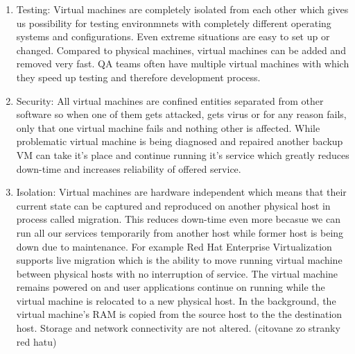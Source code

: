 \begin{enumerate}
\begin{enumerate}
\item Testing: Virtual machines are completely isolated from each other which gives us possibility for testing environmnets with completely different operating systems and configurations. Even extreme situations are easy to set up or changed. Compared to physical machines, virtual machines can be added and removed very fast. QA teams often have multiple virtual machines with which they speed up testing and therefore development process.
\item Security: All virtual machines are confined entities separated from other software so when one of them gets attacked, gets virus or for any reason fails, only that one virtual machine fails and nothing other is affected. While problematic virtual machine is being diagnosed and repaired another backup VM can take it's place and continue running it's service which greatly reduces down-time and increases reliability of offered service.
\item Isolation: Virtual machines are hardware independent which means that their current state can be captured and reproduced on another physical host in process called migration. This reduces down-time even more becasue we can run all our services temporarily from another host while former host is being down due to maintenance. For example Red Hat Enterprise Virtualization supports live migration which is the ability to move running virtual machine between physical hosts with no interruption of service. The virtual machine remains powered on and user applications continue on running while the virtual machine is relocated to a new physical host. In the background, the virtual machine's RAM is copied from the source host to the the destination host. Storage and network connectivity are not altered. (citovane zo stranky red hatu)
\end{enumerate}


\end{enumerate}
